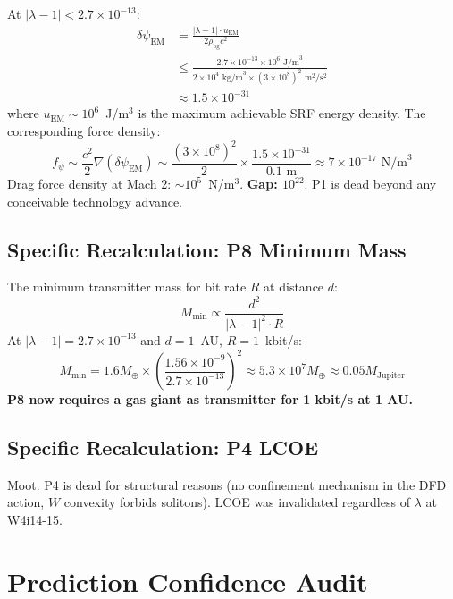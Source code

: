 \documentclass[11pt]{article}
\begin{document}
At $|\lambda-1| < 2.7 \times 10^{-13}$:
\begin{align}
\delta\psi_\text{EM} &= \frac{|\lambda-1| \cdot u_\text{EM}}{2\rho_\text{bg} c^2} \\
&\leq \frac{2.7 \times 10^{-13} \times 10^6 \text{ J/m}^3}{2 \times 10^4 \text{ kg/m}^3 \times (3 \times 10^8)^2 \text{ m}^2/\text{s}^2} \\
&\approx 1.5 \times 10^{-31}
\end{align}
where $u_\text{EM} \sim 10^6$~J/m$^3$ is the maximum achievable SRF energy density. The corresponding force density:
\begin{equation}
f_\psi \sim \frac{c^2}{2} \nabla(\delta\psi_\text{EM}) \sim \frac{(3 \times 10^8)^2}{2} \times \frac{1.5 \times 10^{-31}}{0.1 \text{ m}} \approx 7 \times 10^{-17} \text{ N/m}^3
\end{equation}
Drag force density at Mach 2: $\sim 10^5$~N/m$^3$. \textbf{Gap: $10^{22}$}. P1 is dead beyond any conceivable technology advance.

\subsection{Specific Recalculation: P8 Minimum Mass}

The minimum transmitter mass for bit rate $R$ at distance $d$:
\begin{equation}
M_\text{min} \propto \frac{d^2}{|\lambda-1|^2 \cdot R}
\end{equation}
At $|\lambda-1| = 2.7 \times 10^{-13}$ and $d = 1$~AU, $R = 1$~kbit/s:
\begin{equation}
M_\text{min} = 1.6 M_\oplus \times \left(\frac{1.56 \times 10^{-9}}{2.7 \times 10^{-13}}\right)^2 \approx 5.3 \times 10^7 M_\oplus \approx 0.05 M_\text{Jupiter}
\end{equation}
\textbf{P8 now requires a gas giant as transmitter for 1 kbit/s at 1 AU.}

\subsection{Specific Recalculation: P4 LCOE}

Moot. P4 is dead for structural reasons (no confinement mechanism in the DFD action, $W$ convexity forbids solitons). LCOE was invalidated regardless of $\lambda$ at W4i14-15.

\section{Prediction Confidence Audit}
\end{document}
